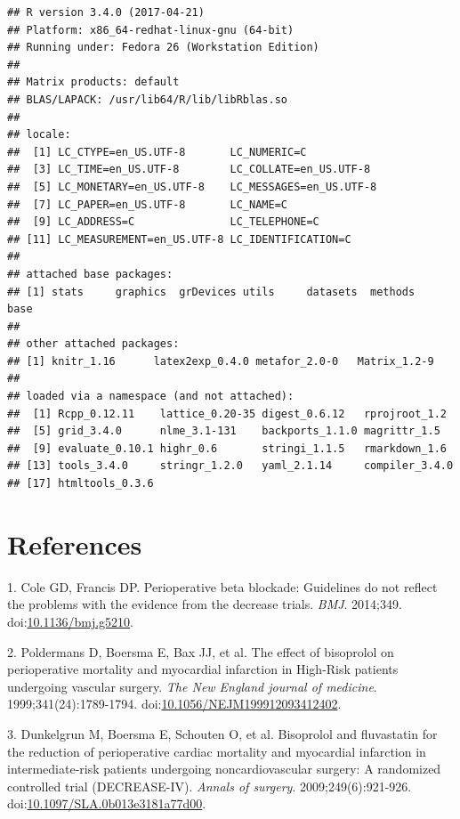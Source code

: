 \documentclass[]{article}
\begin{document}
\begin{verbatim}
## R version 3.4.0 (2017-04-21)
## Platform: x86_64-redhat-linux-gnu (64-bit)
## Running under: Fedora 26 (Workstation Edition)
## 
## Matrix products: default
## BLAS/LAPACK: /usr/lib64/R/lib/libRblas.so
## 
## locale:
##  [1] LC_CTYPE=en_US.UTF-8       LC_NUMERIC=C              
##  [3] LC_TIME=en_US.UTF-8        LC_COLLATE=en_US.UTF-8    
##  [5] LC_MONETARY=en_US.UTF-8    LC_MESSAGES=en_US.UTF-8   
##  [7] LC_PAPER=en_US.UTF-8       LC_NAME=C                 
##  [9] LC_ADDRESS=C               LC_TELEPHONE=C            
## [11] LC_MEASUREMENT=en_US.UTF-8 LC_IDENTIFICATION=C       
## 
## attached base packages:
## [1] stats     graphics  grDevices utils     datasets  methods   base     
## 
## other attached packages:
## [1] knitr_1.16      latex2exp_0.4.0 metafor_2.0-0   Matrix_1.2-9   
## 
## loaded via a namespace (and not attached):
##  [1] Rcpp_0.12.11    lattice_0.20-35 digest_0.6.12   rprojroot_1.2  
##  [5] grid_3.4.0      nlme_3.1-131    backports_1.1.0 magrittr_1.5   
##  [9] evaluate_0.10.1 highr_0.6       stringi_1.1.5   rmarkdown_1.6  
## [13] tools_3.4.0     stringr_1.2.0   yaml_2.1.14     compiler_3.4.0 
## [17] htmltools_0.3.6
\end{verbatim}

\section*{References}\label{references}

\hypertarget{refs}{}
\hypertarget{ref-Coleg5210}{}
1. Cole GD, Francis DP. Perioperative beta blockade: Guidelines do not
reflect the problems with the evidence from the decrease trials.
\emph{BMJ}. 2014;349.
doi:\href{https://doi.org/10.1136/bmj.g5210}{10.1136/bmj.g5210}.

\hypertarget{ref-poldermans1999}{}
2. Poldermans D, Boersma E, Bax JJ, et al. The effect of bisoprolol on
perioperative mortality and myocardial infarction in High-Risk patients
undergoing vascular surgery. \emph{The New England journal of medicine}.
1999;341(24):1789-1794.
doi:\href{https://doi.org/10.1056/NEJM199912093412402}{10.1056/NEJM199912093412402}.

\hypertarget{ref-dunkelgrun2009}{}
3. Dunkelgrun M, Boersma E, Schouten O, et al. Bisoprolol and
fluvastatin for the reduction of perioperative cardiac mortality and
myocardial infarction in intermediate-risk patients undergoing
noncardiovascular surgery: A randomized controlled trial (DECREASE-IV).
\emph{Annals of surgery}. 2009;249(6):921-926.
doi:\href{https://doi.org/10.1097/SLA.0b013e3181a77d00}{10.1097/SLA.0b013e3181a77d00}.
\end{document}
